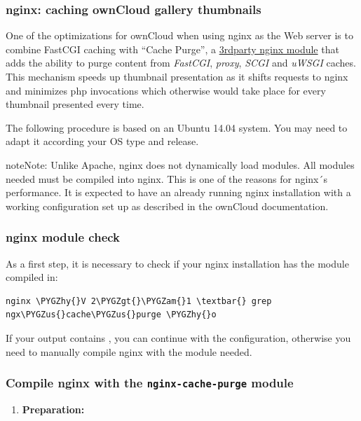 \documentclass[letterpaper,10pt,english]{sphinxmanual}
\def\PYGZus{\char`\_}
\def\PYGZam{\char`\&}
\def\PYGZgt{\char`\>}
\def\PYGZhy{\char`\-}
\begin{document}
\subsubsection{nginx: caching ownCloud gallery thumbnails}
\label{installation/nginx_examples:nginx-caching-owncloud-gallery-thumbnails}
One of the optimizations for ownCloud when using nginx as the Web server is to
combine FastCGI caching with ``Cache Purge'', a \href{http://wiki.nginx.org/3rdPartyModules}{3rdparty nginx module}  that adds the ability to purge
content from \emph{FastCGI}, \emph{proxy}, \emph{SCGI} and \emph{uWSGI} caches. This mechanism
speeds up thumbnail presentation as it shifts requests to nginx and minimizes
php invocations which otherwise would take place for every thumbnail presented
every time.

The following procedure is based on an Ubuntu 14.04 system. You may need to
adapt it according your OS type and release.

\begin{notice}{note}{Note:}
Unlike Apache, nginx does not dynamically load modules. All modules needed
must be compiled into nginx. This is one of the reasons for nginx´s
performance. It is expected to have an already running nginx installation
with a working configuration set up as described in the ownCloud
documentation.
\end{notice}


\subsubsection{nginx module check}
\label{installation/nginx_examples:nginx-module-check}
As a first step, it is necessary to check if your nginx installation has the
 module compiled in:

\begin{Verbatim}[commandchars=\\\{\}]
nginx \PYGZhy{}V 2\PYGZgt{}\PYGZam{}1 \textbar{} grep ngx\PYGZus{}cache\PYGZus{}purge \PYGZhy{}o
\end{Verbatim}

If your output contains , you can continue with the
configuration, otherwise you need to manually compile nginx with the module
needed.


\subsubsection{Compile nginx with the \texttt{nginx-cache-purge} module}
\label{installation/nginx_examples:compile-nginx-with-the-nginx-cache-purge-module}\begin{enumerate}
\item {} 
\textbf{Preparation:}

\end{enumerate}
\end{document}
